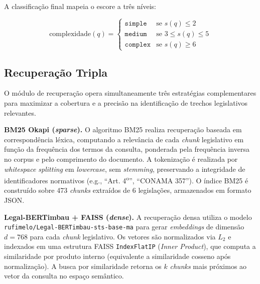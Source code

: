 \documentclass[12pt]{article}
\begin{document}
A classificação final mapeia o escore a três níveis:

\begin{equation}
\text{complexidade}(q) = \begin{cases} \texttt{simple} & \text{se } s(q) \leq 2 \\ \texttt{medium} & \text{se } 3 \leq s(q) \leq 5 \\ \texttt{complex} & \text{se } s(q) \geq 6 \end{cases}
\label{eq:classification}
\end{equation}

\subsection{Recuperação Tripla}

O módulo de recuperação opera simultaneamente três estratégias complementares para maximizar a cobertura e a precisão na identificação de trechos legislativos relevantes.

\textbf{BM25 Okapi (\textit{sparse}).} O algoritmo BM25 \cite{robertson:2009} realiza recuperação baseada em correspondência léxica, computando a relevância de cada \textit{chunk} legislativo em função da frequência dos termos da consulta, ponderada pela frequência inversa no corpus e pelo comprimento do documento. A tokenização é realizada por \textit{whitespace splitting} em \textit{lowercase}, sem \textit{stemming}, preservando a integridade de identificadores normativos (e.g., ``Art. 4\textsuperscript{o}'', ``CONAMA 357''). O índice BM25 é construído sobre 473 \textit{chunks} extraídos de 6 legislações, armazenados em formato JSON.

\textbf{Legal-BERTimbau + FAISS (\textit{dense}).} A recuperação densa utiliza o modelo \texttt{rufimelo/Legal-BERTimbau-sts-base-ma} \cite{rufimelo:2022} para gerar \textit{embeddings} de dimensão $d = 768$ para cada \textit{chunk} legislativo. Os vetores são normalizados via $L_2$ e indexados em uma estrutura FAISS \texttt{IndexFlatIP} (\textit{Inner Product}), que computa a similaridade por produto interno (equivalente a similaridade cosseno após normalização). A busca por similaridade retorna os $k$ \textit{chunks} mais próximos ao vetor da consulta no espaço semântico.
\end{document}
